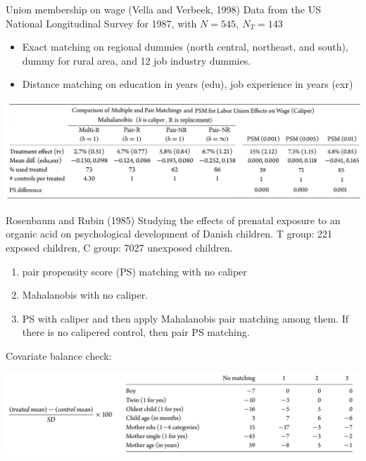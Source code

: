 \documentclass[handout]{beamer}
\begin{document}
  
\begin{frame}{Union membership on wage (Vella and Verbeek, 1998)}
Data from the US National Longitudinal Survey for 1987, with $N = 545,\ N_T = 143$\medskip
\begin{itemize}
	\item Exact matching on regional dummies (north central, northeast, and south), dummy for rural area, and 12 job industry dummies.
	\item Distance matching on education in years (edu), job experience in years (exr)
\end{itemize}
	\includegraphics[width=\linewidth]{./Figures/matching2}
\end{frame}

\begin{frame}{Rosenbaum and	Rubin (1985)}
Studying the effects of prenatal exposure to an organic acid on psychological development of Danish children.
T group: 221 exposed children,  C group: 7027 unexposed children.\medskip

\begin{enumerate}
	\item pair propensity score (PS) matching with no caliper
	\item Mahalanobis with no caliper.
	\item PS with caliper and then apply Mahalanobis pair matching among them. If there is no calipered control, then pair PS matching.
\end{enumerate}

Covariate balance check:

	\includegraphics[width=\linewidth]{./Figures/matching1}


\end{frame}
\end{document}
